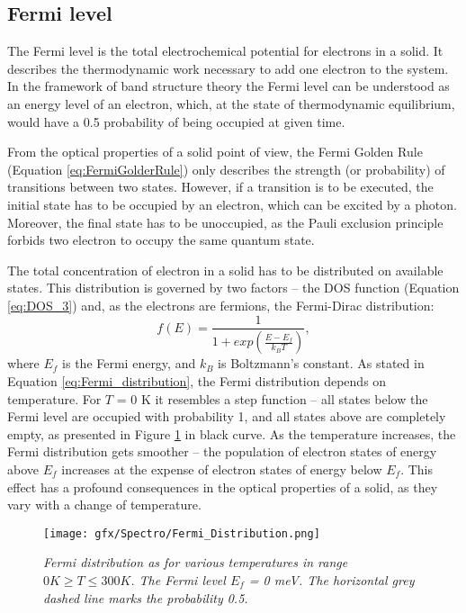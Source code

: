 \documentclass[titlepage,a4paper]{book}
\newcommand{\wciecie}{\quad\phantom{v}}
\begin{document}
\subsection{Fermi level}
\label{section:Fermi_level}
\wciecie
The Fermi level is the total electrochemical potential for electrons in a solid. It describes the thermodynamic work necessary to add one electron to the system. In the framework of band structure theory the Fermi level can be understood as an energy level of an electron, which, at the state of thermodynamic equilibrium, would have a 0.5 probability of being occupied at given time.

From the optical properties of a solid point of view, the Fermi Golden Rule (Equation \ref{eq:FermiGolderRule}) only describes the strength (or probability) of transitions between two states. However, if a transition is to be executed, the initial state has to be occupied by an electron, which can be excited by a photon. Moreover, the final state has to be unoccupied, as the Pauli exclusion principle forbids two electron to occupy the same quantum state. 

The total concentration of electron in a solid has to be distributed on available states. This distribution is governed by two factors -- the DOS function (Equation \ref{eq:DOS_3}) and, as the electrons are fermions, the Fermi-Dirac distribution:
\begin{equation}
\label{eq:Fermi_distribution}
f(E) = \frac{1}{1+exp\left(\frac{E-E_f}{k_B T}\right)},
\end{equation}
where $E_f$ is the Fermi energy, and $k_B$ is Boltzmann's constant. As stated in Equation \ref{eq:Fermi_distribution}, the Fermi distribution depends on temperature. For $T$ = 0 K it resembles a step function -- all states below the Fermi level are occupied with probability 1, and all states above are completely empty, as presented in Figure \ref{fig:Fermi_Distribution} in black curve. As the temperature increases, the Fermi distribution gets smoother -- the population of electron states of energy above $E_f$ increases at the expense of electron states of energy below $E_f$. This effect has a profound consequences in the optical properties of a solid, as they vary with a change of temperature.

\begin{figure}[H]
	\centering
	\texttt{[image: gfx/Spectro/Fermi\_Distribution.png]}
	\vspace{-10pt}
	\caption{\textit{Fermi distribution as for various temperatures in range $0 K \geq T \leq 300 K$. The Fermi level $E_f$ = 0 meV. The horizontal grey dashed line marks the probability 0.5.}}
	\label{fig:Fermi_Distribution}
\end{figure}
\end{document}
